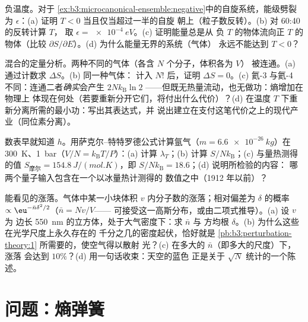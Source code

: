 \begin{exercise}[$\star\star$]\label{exo:b3:microcanonical-ensemble:9}
负温度。对于
\cref{ex:b3:microcanonical-ensemble:negative}中的自旋系统，能级劈裂为
$\epsilon$：(a) 证明 $T < 0$ 当且仅当超过一半的自旋
朝上（粒子数反转）。(b) 对 60:40 的反转计算 $T$，
取 $\epsilon = \qty{e-4}{eV}$。(c) 证明能量总是从
负 $T$ 的物体流向正 $T$ 的物体（比较 $\partial
S/\partial E$）。(d) 为什么能量无界的系统（气体）
永远不能达到 $T < 0$？
\end{exercise}

\begin{exercise}[$\star\star\star$]\label{exo:b3:microcanonical-ensemble:10}
混合的定量分析。两种不同的气体（各含 $N$ 个分子，体积各为 $V$）
被连通。(a) 通过计数求 $\Delta S$。(b) 同一种气体：
计入 $N!$ 后，证明 $\Delta S = 0$。(c) 氦-3 与氦-4
不同：连通二者\emph{确实}会产生 $2Nk_{\text{B}}\ln2$
——但既无热量流动，也无做功：熵增加在物理上
体现在何处（若要重新分开它们，将付出什么代价）？(d)
在温度 $T$ 下重新分离所需的最小功：写出其表达式，并
说出建立在支付这笔代价之上的现代产业（同位素分离）。
\end{exercise}

\begin{exercise}[$\star\star\star$]\label{exo:b3:microcanonical-ensemble:11}
数表早就知道 $h$。用萨克尔–特特罗德公式计算氩气（$m =
\qty{6.6e-26}{kg}$）在 \qty{300}{K}、\qty{1}{bar}（$V/N =
k_{\text{B}}T/P$）：(a) 计算 $\lambda_T$；(b) 计算 $S/N
k_{\text{B}}$；(c) 与量热测得的值
$S_{\text{摩尔}} = \qty{154.8}{J/(mol.K)}$，即 $S/Nk_{\text{B}}
= 18.6$；(d) 说明所检验的内容：
哪两个量子输入包含在一个以冰量热计测得的
数值之中（1912 年以前）？
\end{exercise}

\begin{exercise}[$\star\star\star$]\label{exo:b3:microcanonical-ensemble:12}
能看见的涨落。气体中某一小块体积
$v$ 内分子数的涨落；相对偏差为 $\delta$ 的概率
$\propto\eu^{-\bar n\delta^2/2}$（$\bar n = Nv/V$——
可接受这一高斯分布，或由二项式推导）。(a) 设 $v$ 为
边长 \qty{550}{nm} 的立方体，处于大气密度下：求 $\bar n$ 与
方均根 $\delta$。(b) 为什么这些在光学尺度上永久存在的
千分之几的密度起伏，恰好就是
\cref{pb:b3:perturbation-theory:1} 所需要的，使空气得以散射
光？(c) 在多大的 $\bar n$（即多大的尺度）下，涨落
会达到 $10\%$？(d) 用一句话收束：天空的蓝色
正是关于 $\sqrt N$ 统计的一个陈述。
\end{exercise}

\section{问题：熵弹簧}

